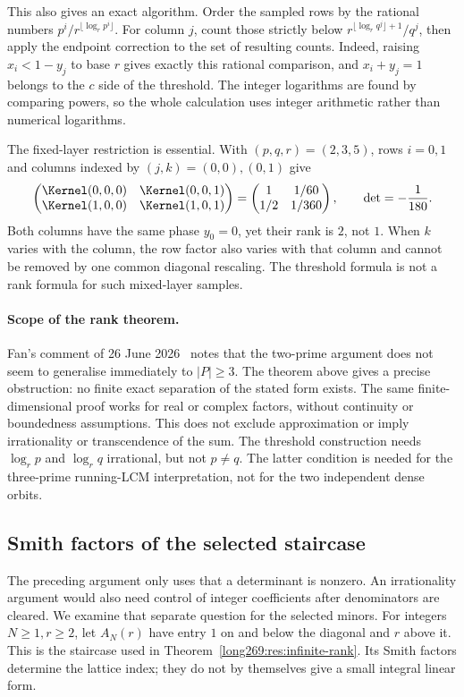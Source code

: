 This also gives an exact algorithm.  Order the sampled rows by the
rational numbers $p^i/r^{\lfloor\log_r p^i\rfloor}$.  For column $j$, count
those strictly below $r^{\lfloor\log_r q^j\rfloor+1}/q^j$, then apply the
endpoint correction to the set of resulting counts.  Indeed, raising
$x_i<1-y_j$ to base $r$ gives exactly this rational comparison, and
$x_i+y_j=1$ belongs to the $c$ side of the threshold.  The integer
logarithms are found by comparing powers, so the whole calculation uses
integer arithmetic rather than numerical logarithms.

The fixed-layer restriction is essential.  With $(p,q,r)=(2,3,5)$, rows
$i=0,1$ and columns indexed by $(j,k)=(0,0),(0,1)$ give
\[
 \begin{pmatrix}
  \Kernel(0,0,0)&\Kernel(0,0,1)\\
  \Kernel(1,0,0)&\Kernel(1,0,1)
 \end{pmatrix}
 =\begin{pmatrix}1&1/60\\1/2&1/360\end{pmatrix},
 \qquad \det=-\frac1{180}.
\]
Both columns have the same phase $y_0=0$, yet their rank is $2$, not $1$.
When $k$ varies with the column, the row factor also varies with that
column and cannot be removed by one common diagonal rescaling.  The
threshold formula is not a rank formula for such mixed-layer samples.

\paragraph{Scope of the rank theorem.}
Fan's comment of 26 June 2026~\cite{fan2026comment} notes that the
two-prime argument does not seem to generalise immediately to $|P|\ge3$.
The theorem above gives a precise obstruction: no finite exact separation
of the stated form exists.  The same finite-dimensional proof works for
real or complex factors, without continuity or boundedness assumptions.
This does not exclude approximation or imply irrationality or
transcendence of the sum.
The threshold construction needs $\log_r p$ and $\log_r q$ irrational,
but not $p\ne q$.  The latter condition is needed for the three-prime
running-LCM interpretation, not for the two independent dense orbits.

\subsection{Smith factors of the selected staircase}
\label{long269:sec:selected-kernel-height}
The preceding argument only uses that a determinant is nonzero. An
irrationality argument would also need control of integer coefficients
after denominators are cleared. We examine that separate question for the
selected minors. For integers $N\ge1,r\ge2$, let $A_N(r)$ have entry $1$
on and below the diagonal and $r$ above it. This is the staircase used in
Theorem~\ref{long269:res:infinite-rank}. Its Smith factors determine the
lattice index; they do not by themselves give a small integral linear form.

